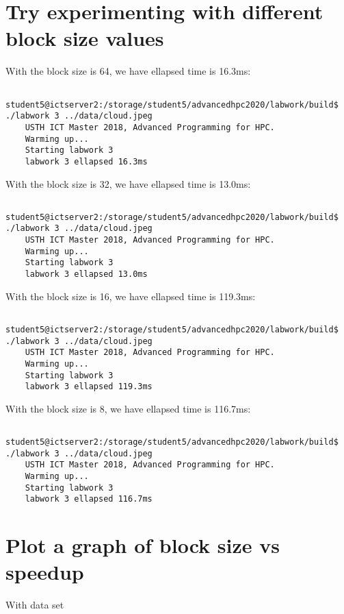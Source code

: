 \documentclass{article}
\begin{document}
\section{Try experimenting with different block size values}
With the block size is 64, we have ellapsed time is 16.3ms:
\begin{verbatim}
    student5@ictserver2:/storage/student5/advancedhpc2020/labwork/build$ ./labwork 3 ../data/cloud.jpeg 
    USTH ICT Master 2018, Advanced Programming for HPC.
    Warming up...
    Starting labwork 3
    labwork 3 ellapsed 16.3ms
\end{verbatim}

\noindent With the block size is 32, we have ellapsed time is 13.0ms:
\begin{verbatim}
    student5@ictserver2:/storage/student5/advancedhpc2020/labwork/build$ ./labwork 3 ../data/cloud.jpeg 
    USTH ICT Master 2018, Advanced Programming for HPC.
    Warming up...
    Starting labwork 3
    labwork 3 ellapsed 13.0ms
\end{verbatim}

\noindent With the block size is 16, we have ellapsed time is 119.3ms:
\begin{verbatim}
    student5@ictserver2:/storage/student5/advancedhpc2020/labwork/build$ ./labwork 3 ../data/cloud.jpeg 
    USTH ICT Master 2018, Advanced Programming for HPC.
    Warming up...
    Starting labwork 3
    labwork 3 ellapsed 119.3ms
\end{verbatim}

\noindent With the block size is 8, we have ellapsed time is 116.7ms:
\begin{verbatim}
    student5@ictserver2:/storage/student5/advancedhpc2020/labwork/build$ ./labwork 3 ../data/cloud.jpeg 
    USTH ICT Master 2018, Advanced Programming for HPC.
    Warming up...
    Starting labwork 3
    labwork 3 ellapsed 116.7ms
\end{verbatim}

\section{Plot a graph of block size vs speedup}
With data set
\end{document}
